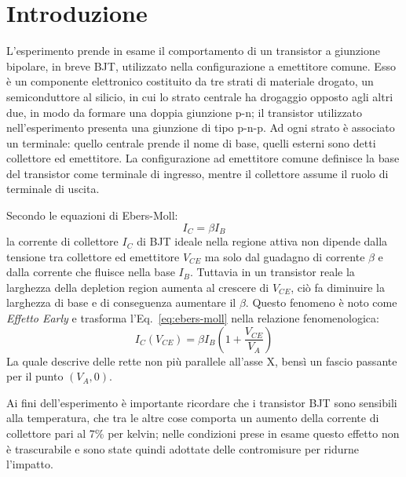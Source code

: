 \documentclass[../main.tex]{subfiles}
\begin{document}
    \section{Introduzione} \label{sec:introduzione}

    L'esperimento prende in esame il comportamento di un transistor a giunzione bipolare,
    in breve BJT, utilizzato nella configurazione a emettitore comune.
    Esso è un componente elettronico costituito da tre strati di materiale drogato,
    un semiconduttore al silicio, in cui lo strato centrale ha drogaggio opposto agli
    altri due, in modo da formare una doppia giunzione p-n; il transistor
    utilizzato nell'esperimento presenta una giunzione di tipo p-n-p.
    Ad ogni strato è associato un terminale: quello centrale prende il nome di base,
    quelli esterni sono detti collettore ed emettitore.
    La configurazione ad emettitore comune definisce la base del transistor come
    terminale di ingresso, mentre il collettore assume il ruolo di terminale di uscita.

    Secondo le equazioni di Ebers-Moll:
    \begin{equation}
        I_C = \beta I_B
        \label{eq:ebers-moll}
    \end{equation}
    la corrente di collettore $I_C$ di BJT ideale nella regione
    attiva non dipende dalla tensione tra collettore ed
    emettitore $V_{CE}$ ma solo dal guadagno di corrente $\beta$ e
    dalla corrente che fluisce nella base $I_B$.
    Tuttavia in un transistor reale la larghezza della depletion
    region aumenta al crescere di $V_{CE}$, ciò fa diminuire la
    larghezza di base e di conseguenza aumentare il $\beta$.
    Questo fenomeno è noto come \textit{Effetto Early} e trasforma
    l'Eq.~\eqref{eq:ebers-moll} nella relazione fenomenologica:
    \begin{equation}
        I_C(V_{CE}) = \beta I_B \left( 1 + \frac{V_{CE}}{V_A} \right)
        \label{eq:early}
    \end{equation}
    La quale descrive delle rette non più parallele all'asse X,
    bensì un fascio passante per il punto $(V_A, 0)$.

    Ai fini dell'esperimento è importante ricordare che i transistor BJT sono sensibili
    alla temperatura, che tra le altre cose comporta un aumento della
    corrente di collettore pari al 7\% per kelvin; nelle condizioni prese in esame
    questo effetto non è trascurabile e sono state quindi adottate delle contromisure per
    ridurne l'impatto.
\end{document}
